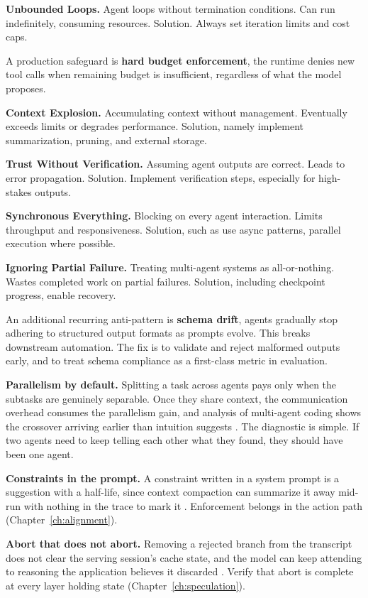 \textbf{Unbounded Loops.} Agent loops without termination conditions. Can run indefinitely, consuming resources. Solution. Always set iteration limits and cost caps.

A production safeguard is \textbf{hard budget enforcement}, the runtime denies new tool calls when remaining budget is insufficient, regardless of what the model proposes.

\textbf{Context Explosion.} Accumulating context without management. Eventually exceeds limits or degrades performance. Solution, namely implement summarization, pruning, and external storage.

\textbf{Trust Without Verification.} Assuming agent outputs are correct. Leads to error propagation. Solution. Implement verification steps, especially for high-stakes outputs.

\textbf{Synchronous Everything.} Blocking on every agent interaction. Limits throughput and responsiveness. Solution, such as use async patterns, parallel execution where possible.

\textbf{Ignoring Partial Failure.} Treating multi-agent systems as all-or-nothing. Wastes completed work on partial failures. Solution, including checkpoint progress, enable recovery.

An additional recurring anti-pattern is \textbf{schema drift}, agents gradually
stop adhering to structured output formats as prompts evolve. This breaks
downstream automation. The fix is to validate and reject malformed outputs early,
and to treat schema compliance as a first-class metric in evaluation.

\textbf{Parallelism by default.} Splitting a task across agents pays only when the
subtasks are genuinely separable. Once they share context, the communication
overhead consumes the parallelism gain, and analysis of multi-agent coding shows
the crossover arriving earlier than intuition suggests \cite{cohesion2026}. The
diagnostic is simple. If two agents need to keep telling each other what they
found, they should have been one agent.

\textbf{Constraints in the prompt.} A constraint written in a system prompt is a
suggestion with a half-life, since context compaction can summarize it away
mid-run with nothing in the trace to mark it \cite{govdecay2026}. Enforcement
belongs in the action path (Chapter~\ref{ch:alignment}).

\textbf{Abort that does not abort.} Removing a rejected branch from the transcript
does not clear the serving session's cache state, and the model can keep attending
to reasoning the application believes it discarded \cite{abortedkv2026}. Verify
that abort is complete at every layer holding state (Chapter~\ref{ch:speculation}).

